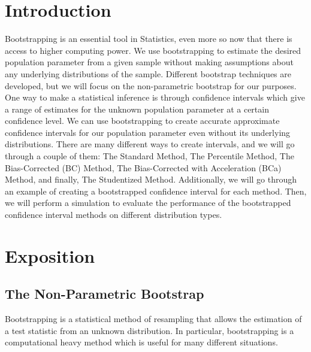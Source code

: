 \documentclass[12pt]{article}
\begin{document}
\newpage
{} %

\hypertarget{introduction}{%
\section{Introduction}\label{introduction}}

Bootstrapping is an essential tool in Statistics, even more so now that
there is access to higher computing power. We use bootstrapping to
estimate the desired population parameter from a given sample without
making assumptions about any underlying distributions of the sample.
Different bootstrap techniques are developed, but we will focus on the
non-parametric bootstrap for our purposes. One way to make a statistical
inference is through confidence intervals which give a range of
estimates for the unknown population parameter at a certain confidence
level. We can use bootstrapping to create accurate approximate
confidence intervals for our population parameter even without its
underlying distributions. There are many different ways to create
intervals, and we will go through a couple of them: The Standard Method,
The Percentile Method, The Bias-Corrected (BC) Method, The
Bias-Corrected with Acceleration (BCa) Method, and finally, The
Studentized Method. Additionally, we will go through an example of
creating a bootstrapped confidence interval for each method. Then, we
will perform a simulation to evaluate the performance of the
bootstrapped confidence interval methods on different distribution
types.

\hypertarget{exposition}{%
\section{Exposition}\label{exposition}}

\hypertarget{the-non-parametric-bootstrap}{%
\subsection{The Non-Parametric
Bootstrap}\label{the-non-parametric-bootstrap}}

Bootstrapping is a statistical method of resampling that allows the
estimation of a test statistic from an unknown distribution. In
particular, bootstrapping is a computational heavy method which is
useful for many different situations.
\end{document}
